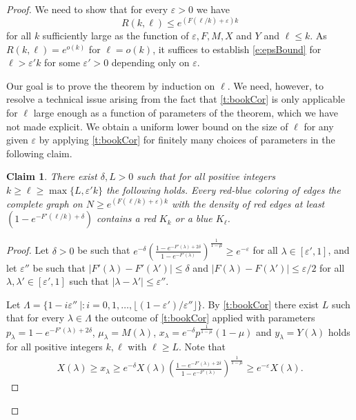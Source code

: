 \documentclass[reqno,final,12pt]{amsart}
\newtheorem{claim}{Claim}[thm]
\newcommand{\eps}{\varepsilon}
\newcommand{\fs}[2]{\left(\frac{#1}{#2}\right)}
\newcommand{\s}[1]{\left(#1\right)}
\begin{document}
\begin{proof} We need to show that for every $\eps > 0$ we have \begin{equation}\label{e:epsBound}R(k,\ell) \leq e^{(F(\ell/k)+\eps)k}\end{equation} for all $k$ sufficiently large as the function of $\eps,F,M,X$ and $Y$ and $\ell \leq k$. As $R(k,\ell) = e^{o(k)}$ for  $\ell=o(k)$, it suffices to establish \eqref{e:epsBound} for $\ell > \eps'k$ for some $\eps'>0$ depending only on $\eps$.
	
	
Our goal is to prove the theorem by induction on $\ell$. We need, however, to resolve a technical issue arising from the fact that \cref{t:bookCor} is only applicable for $\ell$ large enough as a function of parameters of the theorem, which we have not made explicit. We obtain a uniform lower bound on the size of $\ell$ for any given $\eps$ by applying  \cref{t:bookCor} for finitely many choices of parameters  in the following claim.

\begin{claim}\label{c:gen}
	There exist $\delta, L >0$  such that for all positive integers  $k \geq \ell \geq \max\{ L, \eps' k \}$ the following holds.  Every red-blue coloring of edges the complete graph on $N \geq e^{(F(\ell/k)+\eps)k}$ with the density of red edges at least $(1 - e^{-F'(\ell/k)+\delta})$ contains a red $K_k$ or a blue $K_{\ell}$. 
\end{claim}

\begin{proof}  %
	Let $\delta > 0$ be such that $e^{-\delta}\fs{1 - e^{-F'(\lambda)+2\delta}}{1-e^{-F'(\lambda)}}^{\frac{1}{1-\mu}} \geq e^{-\eps}$ for all $\lambda \in [\eps',1]$, and let $\eps''$ be such that $|F'(\lambda)-F'(\lambda')| \leq \delta$ and $|F(\lambda)-F(\lambda')| \leq \eps/2$ for all $\lambda,\lambda' \in [\eps',1]$ such that $|\lambda-\lambda'| \leq \eps''$.
	
	Let $\Lambda=\{1 - i\eps'' \: |: i=0,1,\ldots, \lfloor (1-\eps')/\eps''\rfloor\} $.
	By  \cref{t:bookCor} there exist $L$ such that for every $\lambda \in \Lambda$ the outcome of \cref{t:bookCor}  applied with parameters $p_\lambda=1 - e^{-F'(\lambda)+2\delta}$,  $\mu_{\lambda}=M(\lambda)$, $x_{\lambda} = e^{-\delta}p^{\frac{1}{1-\mu}}(1-\mu)$ and $y_{\lambda} = Y(\lambda)$ holds for all  positive integers $k,\ell$ with $\ell \geq L.$ Note that \begin{align*} X(\lambda) \geq x_{\lambda} \geq  e^{-\delta}X(\lambda)\fs{1 - e^{-F'(\lambda)+2\delta}}{1-e^{-F'(\lambda)}}^{\frac{1}{1-\mu}} \geq e^{-\eps}X(\lambda). \end{align*} 
	

\end{proof}
\end{proof}
\end{document}
